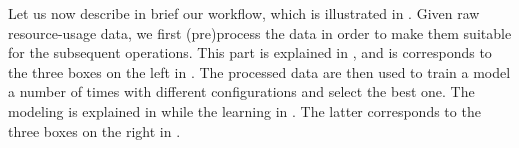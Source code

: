 Let us now describe in brief our workflow, which is illustrated in
. Given raw resource-usage data, we first (pre)process the data
in order to make them suitable for the subsequent operations. This part is
explained in , and is corresponds to the three boxes on the left in
. The processed data are then used to train a model a number of
times with different configurations and select the best one. The modeling is
explained in  while the learning in . The latter
corresponds to the three boxes on the right in .
